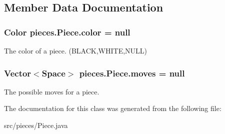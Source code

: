 \subsection{Member Data Documentation}
\hypertarget{classpieces_1_1_piece_aad2c2ef830902ae3d7da9709976216d6}{
\subsubsection[{color}]{\setlength{\rightskip}{0pt plus 5cm}Color pieces.\-Piece.\-color = null\hspace{0.3cm}{\ttfamily [protected]}}}\label{classpieces_1_1_piece_aad2c2ef830902ae3d7da9709976216d6}
The color of a piece. (B\-L\-A\-C\-K,W\-H\-I\-T\-E,N\-U\-L\-L) \hypertarget{classpieces_1_1_piece_a64fbd75313e761ca2f13e3e542a06ec7}{
\subsubsection[{moves}]{\setlength{\rightskip}{0pt plus 5cm}Vector$<${\bf Space}$>$ pieces.\-Piece.\-moves = null\hspace{0.3cm}{\ttfamily [protected]}}}\label{classpieces_1_1_piece_a64fbd75313e761ca2f13e3e542a06ec7}
The possible moves for a piece. 

The documentation for this class was generated from the following file\-:\begin{DoxyCompactItemize}
\item 
src/pieces/Piece.\-java\end{DoxyCompactItemize}
